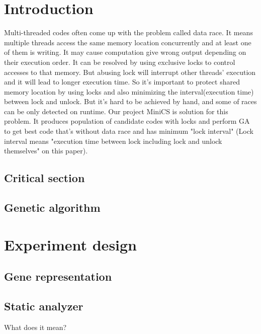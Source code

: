 \documentclass[sigconf]{acmart}
\begin{document}
\section{Introduction}
Multi-threaded codes often come up with the problem called data race. It means multiple threads access the same memory location concurrently and at least one of them is writing. It may cause computation give wrong output depending on their execution order. It can be resolved by using exclusive locks to control accesses to that memory. But abusing lock will interrupt other threads' execution and it will lead to longer execution time.
So it's important to protect shared memory location by using locks and also minimizing the interval(execution time) between lock and unlock. But it's hard to be achieved by hand, and some of races can be only detected on runtime.
Our project MiniCS is solution for this problem. It produces population of candidate codes with locks and perform GA to get best code that's without data race and has minimum "lock interval" (Lock interval means "execution time between lock including lock and unlock themselves" on this paper).



\subsection{Critical section}

\subsection{Genetic algorithm}

\section{Experiment design}



\subsection{Gene representation}







\subsection{Static analyzer}
What does it mean?
\end{document}
